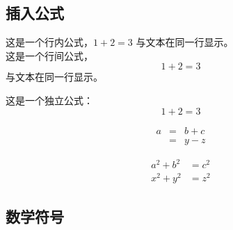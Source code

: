 \documentclass[a4paper,12pt]{article}
\begin{document}
        \subsection{插入公式}
        
        这是一个行内公式，$1+2=3$ 与文本在同一行显示。
        \\ \indent 这是一个行间公式，$$1+2=3$$   \indent 与文本在同一行显示。

        \vspace{1cm}

        \indent 这是一个独立公式：
            \begin{equation*}
                1+2=3
            \end{equation*}
    
            \begin{eqnarray*}
                a & =& b + c \\
                & = & y - z
            \end{eqnarray*}

            \begin{align*}
               a^2 + b^2 &= c^2 \\
               x^2 + y^2 &= z^2
            \end{align*}
        
        \subsection{数学符号}
            
\end{document}
